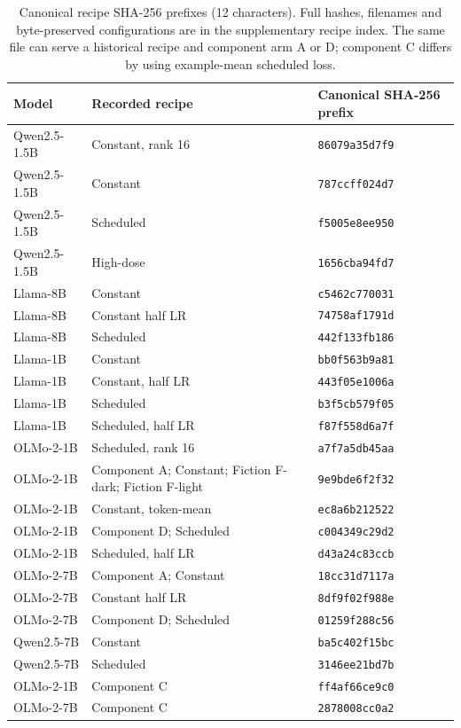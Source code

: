 \documentclass{article}
\begin{document}
\begin{table}[!htbp]
  \caption{Canonical recipe SHA-256 prefixes (12 characters). Full hashes,
    filenames and byte-preserved configurations are in the supplementary
    recipe index. The same file can serve a historical recipe and component
    arm A or D; component C differs by using example-mean scheduled loss.}
  \label{tab:recipepins}
  \centering\footnotesize
  \begin{tabular}{@{}L{3.0cm}L{7.0cm}L{3.4cm}@{}}
    \toprule
    Model & Recorded recipe & Canonical SHA-256 prefix \\
    \midrule
    Qwen2.5-1.5B & Constant, rank 16 & \texttt{86079a35d7f9} \\
    Qwen2.5-1.5B & Constant & \texttt{787ccff024d7} \\
    Qwen2.5-1.5B & Scheduled & \texttt{f5005e8ee950} \\
    Qwen2.5-1.5B & High-dose & \texttt{1656cba94fd7} \\
    Llama-8B & Constant & \texttt{c5462c770031} \\
    Llama-8B & Constant half LR & \texttt{74758af1791d} \\
    Llama-8B & Scheduled & \texttt{442f133fb186} \\
    Llama-1B & Constant & \texttt{bb0f563b9a81} \\
    Llama-1B & Constant, half LR & \texttt{443f05e1006a} \\
    Llama-1B & Scheduled & \texttt{b3f5cb579f05} \\
    Llama-1B & Scheduled, half LR & \texttt{f87f558d6a7f} \\
    OLMo-2-1B & Scheduled, rank 16 & \texttt{a7f7a5db45aa} \\
    OLMo-2-1B & Component A; Constant; Fiction F-dark; Fiction F-light & \texttt{9e9bde6f2f32} \\
    OLMo-2-1B & Constant, token-mean & \texttt{ec8a6b212522} \\
    OLMo-2-1B & Component D; Scheduled & \texttt{c004349c29d2} \\
    OLMo-2-1B & Scheduled, half LR & \texttt{d43a24c83ccb} \\
    OLMo-2-7B & Component A; Constant & \texttt{18cc31d7117a} \\
    OLMo-2-7B & Constant half LR & \texttt{8df9f02f988e} \\
    OLMo-2-7B & Component D; Scheduled & \texttt{01259f288c56} \\
    Qwen2.5-7B & Constant & \texttt{ba5c402f15bc} \\
    Qwen2.5-7B & Scheduled & \texttt{3146ee21bd7b} \\
    OLMo-2-1B & Component C & \texttt{ff4af66ce9c0} \\
    OLMo-2-7B & Component C & \texttt{2878008cc0a2} \\
    \bottomrule
  \end{tabular}
\end{table}
\end{document}
